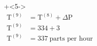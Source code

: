 \documentclass[handout,11pt,aspectratio=169,mathserif]{beamer}
\begin{document}
\begin{frame}
\begin{columns}[T]
			\vspace{-1.1cm}
			
			\vspace{-2.8cm}
			
			\onslide+<5->{
				\begin{align*} 
					\text{T}^{(9)} &= \text{T}^{(8)} + \Delta \text{P} \\
					\text{T}^{(9)} &= 334 + 3 \\
					\text{T}^{(9)} &= 337 ~\text{parts per hour}
				\end{align*}
			}
			
			
			
	\end{columns}
\end{frame}
\end{document}
